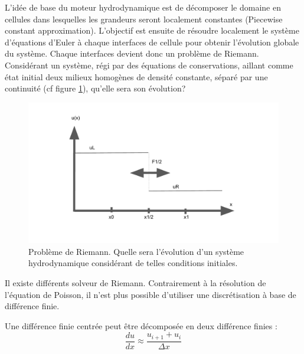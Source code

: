 L'idée de base du moteur hydrodynamique est de décomposer le domaine en cellules dans lesquelles les grandeurs seront localement constantes (Piecewise constant approximation).
L'objectif est ensuite de résoudre localement le système d'équations d'Euler à chaque interfaces de cellule pour obtenir l'évolution globale du système.
Chaque interfaces devient donc un problème de Riemann.
Considérant un système, régi par des équations de conservations, aillant comme état initial deux milieux homogènes de densité constante, séparé par une continuité (cf figure \ref{fig:riemann}), qu'elle sera son évolution?


\begin{figure}
        \includegraphics[width=.95\linewidth]{img/02/riemann.pdf} 
        \caption[Problème de Riemann]{Problème de Riemann. Quelle sera l'évolution d'un système hydrodynamique considérant de telles conditions initiales.  
 		\label{fig:riemann}
 		}
\end{figure}

Il existe différents solveur de Riemann.
Contrairement à la résolution de l’équation de Poisson, il n'est plus possible d'utiliser une discrétisation à base de différence finie.

Une différence finie centrée peut être décomposée en deux différence finies : 
\begin{equation}
\frac{d u}{dx} \approx \frac{u_{i+1}  + u_i}{\Delta x} 
\end{equation}

